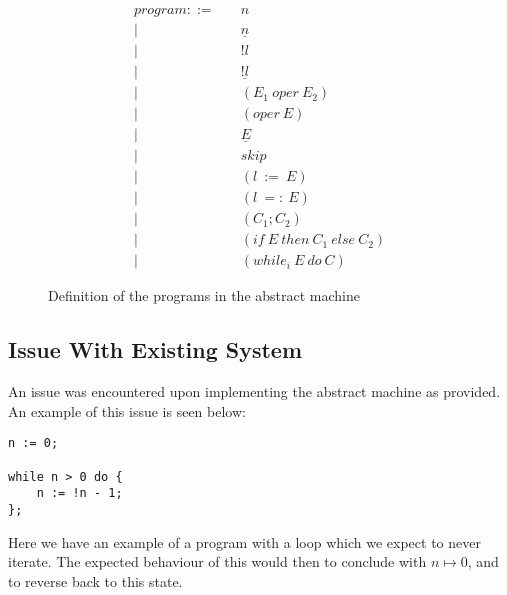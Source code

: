 \begin{figure}[hbt!]
    \centering
    \begin{align*}
        program ::=&\quad n \\
        |&\quad \underline{n} \\
        |&\quad !l \\
        |&\quad \underline{!l} \\
        |&\quad (E_1\ oper\ E_2) \\
        |&\quad (oper\ E) \\
        |&\quad \underline{E} \\
        |&\quad skip \\
        |&\quad (l\ :=\ E) \\
        |&\quad (l\ =:\ E) \\
        |&\quad (C_1;C_2) \\
        |&\quad (if\ E\ then\ C_1\ else\ C_2) \\
        |&\quad (while_i\ E\ do\ C)
    \end{align*}
    \caption{Definition of the programs in the abstract machine}
    \label{fig:prog}
\end{figure}

\subsection{Issue With Existing System}\label{appendix:amissue}

An issue was encountered upon implementing the abstract machine as provided. An example of this issue is seen below:

\begin{lstlisting}[label={lst:whileloopproblem}]
n := 0;

while n > 0 do {
    n := !n - 1;
};
\end{lstlisting}

Here we have an example of a \rimp program with a loop which we expect to never iterate. The expected behaviour of this would then to conclude with $n \mapsto 0$, and to reverse back to this state.


